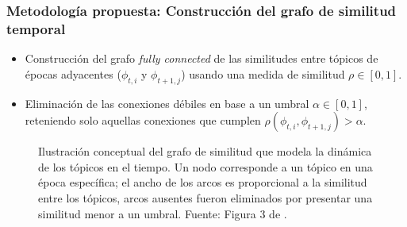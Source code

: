 \documentclass[
	spanish, %
	aspectratio=43, %
	hyperref={pdfencoding=auto,psdextra},
	xcolor={dvipsnames,table,usenames},
]{beamer}
\begin{document}
\begin{frame}[t]
\frametitle{Metodología propuesta: Construcción del grafo de similitud temporal}
\begin{itemize}
  \item Construcción del grafo \textit{fully connected} de las similitudes entre tópicos de épocas adyacentes ($\phi_{t,i}$ y $\phi_{t+1,j}$) usando una medida de similitud $\rho \in [0,1]$.
  \item Eliminación de las conexiones débiles en base a un umbral $\alpha \in [0,1]$, reteniendo solo aquellas conexiones que cumplen $\rho(\phi_{t,i}, \phi_{t+1,j}) > \alpha$.
\end{itemize}

\vspace*{-0.3in}
\begin{figure}
\caption{Ilustración conceptual del grafo de similitud que modela la dinámica de los tópicos en el tiempo. Un nodo corresponde a un tópico en una época específica; el ancho de los arcos es proporcional a la similitud entre los tópicos, arcos ausentes fueron eliminados por presentar una similitud menor a un umbral. Fuente:  Figura 3 de \cite{beykikhoshk2018discovering}.}
\label{img:graph}
\end{figure}		

\end{frame}
\end{document}
